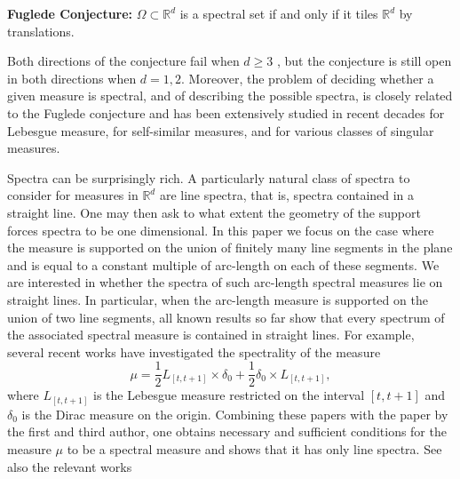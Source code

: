 \documentclass[12pt,a4paper,intlimits,sumlimits]{amsart}
\theoremstyle{plain}
\theoremstyle{definition}
\newcommand{\RR}{{\mathbb R}}
\begin{document}
{\bf{Fuglede Conjecture:}} $\Omega\subset \mathbb{R}^d$ is a  spectral set  if and only if  it tiles $\mathbb{R}^d$  by translations.


Both directions of the conjecture fail when $d\geq 3$  \cite{tao2004fuglede,kolountzakis2006tiles,kolountzakis2006hadamard,farkas2006onfuglede,farkas2006tiles}, but  the conjecture is still open in both directions when $d=1,2$. Moreover, the problem of deciding whether a given measure  is spectral, and of describing the possible spectra, is closely related to the Fuglede conjecture and has been extensively studied in recent decades for Lebesgue measure, for self-similar measures, and for various classes of singular measures. 

Spectra can be surprisingly rich. A particularly natural class of spectra to consider  for measures in $\RR^d$  are line spectra, that is, spectra contained in a straight line. One may then ask to what extent the geometry of the support forces spectra to be one dimensional. In this paper we focus on the case where the measure is supported on the union of finitely many line segments in the plane   and is equal to a constant multiple of arc-length on each of these segments. We are interested in whether the spectra of such arc-length spectral measures lie on straight lines.
In particular, when the arc-length measure is supported on the union of two line segments, all known results so far show that every spectrum of the associated spectral measure is contained in   straight lines. For example, several recent works have investigated the spectrality of the   measure
\[
\mu=\frac{1}{2}L_{[t, t+1]}\times\delta_0+\frac{1}{2}\delta_0\times L_{[t, t+1]},
\]
 where $L_{[t, t+1]}$ is the Lebesgue measure restricted on the interval $[t, t+1]$ and $\delta_0$ is the Dirac measure on the origin. 
Combining these papers \cite{kolountzakis2025non,Lev18,lai2021spectral,ai2023spectrality} with the  paper \cite{kolountzakis2025spectrality} by the first and third author, one obtains necessary and sufficient conditions for the measure $\mu$  to be a spectral measure and shows that it has only line spectra. See also the relevant works \cite{kolountzakis2025non,chen2025fourier}
\end{document}
